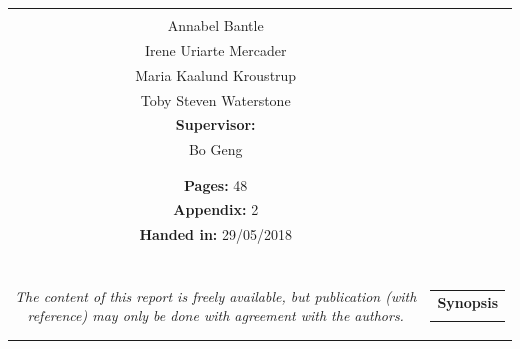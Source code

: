 \begin{titlepage}
\begin{nopagebreak}
{\begin{tabular}{cc}
{{\textbf{Participants:}\\
Annabel Bantle \\
Irene Uriarte Mercader \\
Maria Kaalund Kroustrup \\
Toby Steven Waterstone \\


\textbf{Supervisor:}\\
Bo Geng

}\\
\\
\\
\textbf{Pages:} 48 \\
\textbf{Appendix:} 2 \\
\textbf{Handed in:} 29/05/2018\\
\\
\\
\\
\\
\\
\textit{The content of this report is freely available, but publication (with reference) may only be done with
	agreement with the authors.}
\vfill } &
\parbox{7cm}{
  \vspace{.15cm}
  \hfill
  \begin{tabular}{l}
  {\textbf{Synopsis}}\bigskip \\
  \fbox{
    \parbox{7cm}{\bigskip
     {\vfill{\small 
     \bigskip}}
     }}
   \end{tabular}}
\end{tabular}} %


\end{nopagebreak}
\end{titlepage}
%